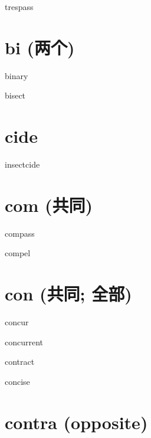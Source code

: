 \begin{wordRef}{trespass}
\end{wordRef}

\section{bi (两个)}

\begin{wordRef}{binary}
\end{wordRef}

\begin{wordRef}{bisect}
\end{wordRef}

\section{cide}

\begin{wordRef}{insectcide}
\end{wordRef}

\section{com (共同)}

\begin{wordRef}{compass}
\end{wordRef}

\begin{wordRef}{compel}
\end{wordRef}

\section{con (共同; 全部)}
\begin{wordRef}{concur}
\end{wordRef}

\begin{wordRef}{concurrent}
\end{wordRef}

\begin{wordRef}{contract}
\end{wordRef}

\begin{wordRef}{concise}
\end{wordRef}

\section{contra (opposite)}

